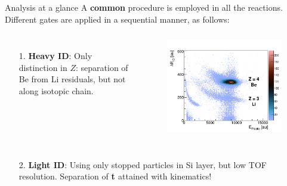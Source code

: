 \documentclass[sans,
frameno, %
mp,
usenames,dvipsnames, %
onlytextwidth, %
t,%
11pt]{beamer}
\newcommand{\notice}[1]{\textbf{\alert{#1}}}
\newcommand{\iso}[2]{\ce{^{#1}#2}}
\begin{document}
\begin{frame}{Analysis at a glance}
    A \textbf{common} procedure is employed in all the reactions. Different gates are applied in a sequential manner, as follows:

    \bigskip
    {
        \begin{columns}[c]
            {
                \begin{enumerate}
                    \item[1.] \textbf{Heavy ID}: Only distinction in $Z$: separation of Be from Li residuals, but not along isotopic chain.
                \end{enumerate}
            }\hfill
            {
                \begin{figure}
                    \centering
                    \includegraphics[width=1\linewidth]{figures/Workshop/heavy.png}
                \end{figure}
            }
        \end{columns}
    }
    {
        \addtocounter{framenumber}{1}
        \begin{columns}[c]
            {
                \begin{enumerate}
                    \item[2.] \textbf{Light ID}: Using only stopped particles in Si layer, but low TOF resolution. Separation of \notice{\textbf{t \textminus \iso{3}{He}}} attained with kinematics!
                \end{enumerate}

}
\end{columns}}
\end{frame}
\end{document}
